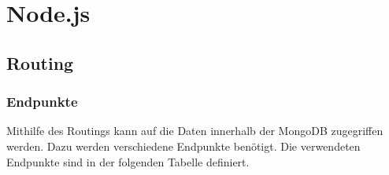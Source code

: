 \section{Node.js}

\subsection{Routing}

\subsubsection{Endpunkte}

Mithilfe des Routings kann auf die Daten innerhalb der MongoDB zugegriffen werden. Dazu werden verschiedene Endpunkte benötigt. Die verwendeten Endpunkte sind in der folgenden Tabelle definiert.

